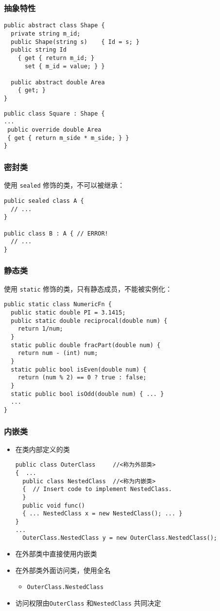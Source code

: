 \begin{frame}[fragile]
\frametitle{抽象特性}
\begin{lstlisting}
public abstract class Shape {
  private string m_id;
  public Shape(string s)    { Id = s; }
  public string Id
    { get { return m_id; }
      set { m_id = value; } }

  public abstract double Area
    { get; }
}
\end{lstlisting}
\begin{lstlisting}
public class Square : Shape {
...
 public override double Area
 { get { return m_side * m_side; } }
}
\end{lstlisting}
\end{frame}

\begin{frame}[fragile]
\frametitle{密封类}
使用 \texttt{sealed} 修饰的类，不可以被继承：
\begin{lstlisting}
public sealed class A {
  // ...
}

public class B : A { // ERROR!
  // ...
}
\end{lstlisting}

\end{frame}

\begin{frame}[fragile]
\frametitle{静态类}
使用 \texttt{static} 修饰的类，只有静态成员，不能被实例化：
\begin{lstlisting}[escapeinside=<>]
public static class NumericFn {
  public static double PI = 3.1415;
  public static double reciprocal(double num) {
    return 1/num;
  }
  static public double fracPart(double num) {
    return num - (int) num;
  }
  static public bool isEven(double num) {
    return (num % 2) == 0 ? true : false;
  }
  static public bool isOdd(double num) { ... }
  ...
}
\end{lstlisting}
\end{frame}

\begin{frame}[fragile]
\frametitle{内嵌类}
\begin{itemize}
\item 在类内部定义的类
\begin{lstlisting}[escapeinside=<>]
public class OuterClass     //<称为外部类>
{  ...
  public class NestedClass  //<称为内嵌类>
  {  // Insert code to implement NestedClass.
  }
  public void func()
  { ... NestedClass x = new NestedClass(); ... }
}
...
  OuterClass.NestedClass y = new OuterClass.NestedClass();
\end{lstlisting}
\item 在外部类中直接使用内嵌类
\item 在外部类外面访问类，使用全名
  \begin{itemize}
  \item \texttt{OuterClass.NestedClass}
  \end{itemize}
\item 访问权限由\texttt{OuterClass} 和\texttt{NestedClass} 共同决定
\end{itemize}
\end{frame}

